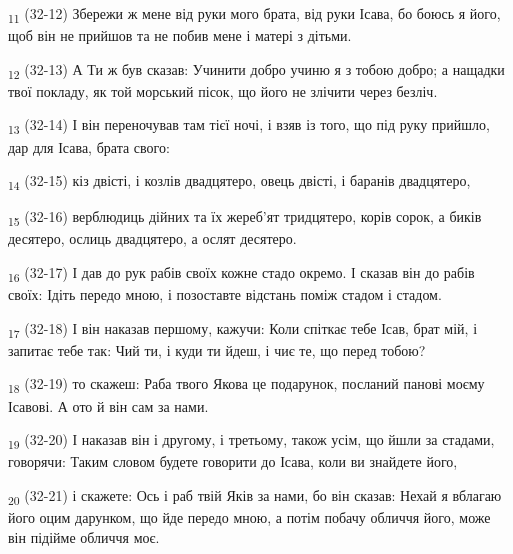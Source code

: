\begin{tcolorbox}
\textsubscript{11} (32-12) Збережи ж мене від руки мого брата, від руки Ісава, бо боюсь я його, щоб він не прийшов та не побив мене і матері з дітьми.
\end{tcolorbox}
\begin{tcolorbox}
\textsubscript{12} (32-13) А Ти ж був сказав: Учинити добро учиню я з тобою добро; а нащадки твої покладу, як той морський пісок, що його не злічити через безліч.
\end{tcolorbox}
\begin{tcolorbox}
\textsubscript{13} (32-14) І він переночував там тієї ночі, і взяв із того, що під руку прийшло, дар для Ісава, брата свого:
\end{tcolorbox}
\begin{tcolorbox}
\textsubscript{14} (32-15) кіз двісті, і козлів двадцятеро, овець двісті, і баранів двадцятеро,
\end{tcolorbox}
\begin{tcolorbox}
\textsubscript{15} (32-16) верблюдиць дійних та їх жереб'ят тридцятеро, корів сорок, а биків десятеро, ослиць двадцятеро, а ослят десятеро.
\end{tcolorbox}
\begin{tcolorbox}
\textsubscript{16} (32-17) І дав до рук рабів своїх кожне стадо окремо. І сказав він до рабів своїх: Ідіть передо мною, і позоставте відстань поміж стадом і стадом.
\end{tcolorbox}
\begin{tcolorbox}
\textsubscript{17} (32-18) І він наказав першому, кажучи: Коли спіткає тебе Ісав, брат мій, і запитає тебе так: Чий ти, і куди ти йдеш, і чиє те, що перед тобою?
\end{tcolorbox}
\begin{tcolorbox}
\textsubscript{18} (32-19) то скажеш: Раба твого Якова це подарунок, посланий панові моєму Ісавові. А ото й він сам за нами.
\end{tcolorbox}
\begin{tcolorbox}
\textsubscript{19} (32-20) І наказав він і другому, і третьому, також усім, що йшли за стадами, говорячи: Таким словом будете говорити до Ісава, коли ви знайдете його,
\end{tcolorbox}
\begin{tcolorbox}
\textsubscript{20} (32-21) і скажете: Ось і раб твій Яків за нами, бо він сказав: Нехай я вблагаю його оцим дарунком, що йде передо мною, а потім побачу обличчя його, може він підійме обличчя моє.
\end{tcolorbox}
